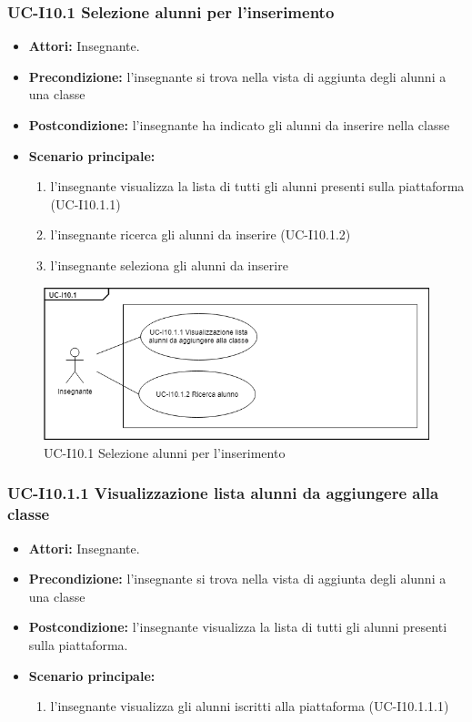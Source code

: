 \subsubsection{UC-I10.1 Selezione alunni per l'inserimento}
\begin{itemize}
	\item \textbf{Attori:} Insegnante.
	\item \textbf{Precondizione:} l'insegnante si trova nella vista di aggiunta degli alunni a una classe
	\item \textbf{Postcondizione:} l'insegnante ha indicato gli alunni da inserire nella classe
	\item \textbf{Scenario principale:}
	\begin{enumerate}
		\item l'insegnante visualizza la lista di tutti gli alunni presenti sulla piattaforma (UC-I10.1.1)
		\item l'insegnante ricerca gli alunni da inserire (UC-I10.1.2)	
		\item l'insegnante seleziona gli alunni da inserire
	\end{enumerate}
\end{itemize}

\begin{figure}[h]
		\centering
		\includegraphics[scale=0.7]{images/UC-I10_1.png}
		\caption{UC-I10.1 Selezione alunni per l'inserimento}
	\end{figure}

\subsubsection{UC-I10.1.1 Visualizzazione lista alunni da aggiungere alla classe}
\begin{itemize}
	\item \textbf{Attori:} Insegnante.
	\item \textbf{Precondizione:} l'insegnante si trova nella vista di aggiunta degli alunni a una classe
	\item \textbf{Postcondizione:} l'insegnante visualizza la lista di tutti gli alunni presenti sulla piattaforma.
	\item \textbf{Scenario principale:}
	\begin{enumerate}
		\item l'insegnante visualizza gli alunni iscritti alla piattaforma (UC-I10.1.1.1)
	\end{enumerate}
\end{itemize}

